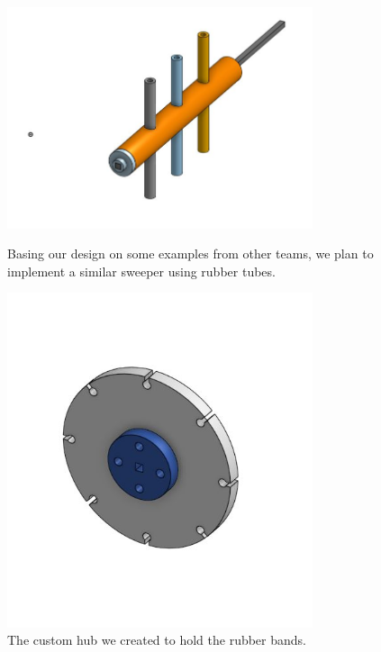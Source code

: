 \begin{figure}[ht]
\centering
\begin{minipage}[b]{.50\textwidth}
  \centering
  \includegraphics[width=0.8\textwidth]{Meetings/August/08-20-21/8-18-21_CAD_Image7 - Nathan Forrer.jpg}
  \caption{Basing our design on some examples from other teams, we plan to implement a similar sweeper using rubber tubes.}
  \label{fig:pic7}
\end{minipage}%
\hfill%
\begin{minipage}[b]{.50\textwidth}
  \centering
  \includegraphics[width=0.8\textwidth]{Meetings/August/08-20-21/8-18-21_CAD_Image8 - Nathan Forrer.jpg}
  \caption{The custom hub we created to hold the rubber bands.}
  \label{fig:pic8}
\end{minipage}
\end{figure}

